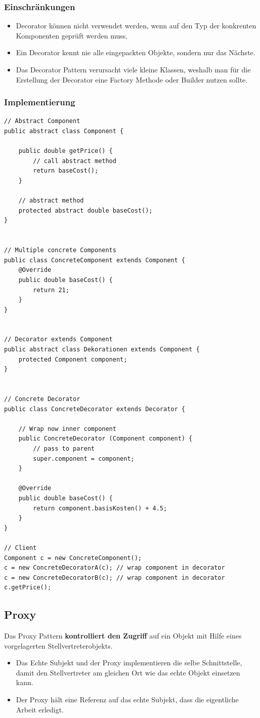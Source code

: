 \subsubsection{Einschränkungen}
\begin{itemize}
	\item Decorator können nicht verwendet werden, wenn auf den Typ der konkrenten Komponenten geprüft werden muss.
	\item Ein Decorator kennt nie alle eingepackten Objekte, sondern nur das Nächste.
	\item Das Decorator Pattern verursacht viele kleine Klassen, weshalb man für die Erstellung der Decorator eine Factory Methode oder Builder nutzen sollte.
\end{itemize}

\subsubsection{Implementierung}
\begin{lstlisting}
// Abstract Component
public abstract class Component {
	
	public double getPrice() {
		// call abstract method
		return baseCost();
	}
	
	// abstract method
	protected abstract double baseCost();
}


// Multiple concrete Components
public class ConcreteComponent extends Component {
	@Override
	public double baseCost() {
		return 21;
	}
}


// Decorator extends Component
public abstract class Dekorationen extends Component {
	protected Component component;
}


// Concrete Decorator
public class ConcreteDecorator extends Decorator {

	// Wrap now inner component
	public ConcreteDecorator (Component component) {
		// pass to parent
		super.component = component;
	}
	
	@Override
	public double baseCost() {
		return component.basisKosten() + 4.5;
	}
}

// Client
Component c = new ConcreteComponent();
c = new ConcreteDecoratorA(c); // wrap component in decorator
c = new ConcreteDecoratorB(c); // wrap component in decorator
c.getPrice();
\end{lstlisting}

\clearpage

\subsection{Proxy}
\label{sec:proxy}
Das Proxy Pattern \textbf{kontrolliert den Zugriff} auf ein Objekt mit Hilfe eines vorgelagerten Stellvertreterobjekts.
\begin{itemize}
	\item Das Echte Subjekt und der Proxy implementieren die selbe Schnittstelle, damit den Stellvertreter am gleichen Ort wie das echte Objekt einsetzen kann.
	\item Der Proxy hält eine Referenz auf das echte Subjekt, dass die eigentliche Arbeit erledigt.
\end{itemize}

